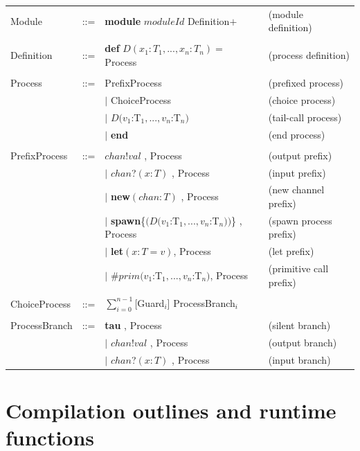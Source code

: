 \documentclass[a4paper,11pt]{article}
\newcommand{\kw}[1]{\textsf{\textbf{#1}}}
\newcommand{\code}[1]{\textsf{#1}}
\begin{document}
\begin{tabular}{llll}
Module & ::= & \kw{module} $moduleId$ Definition$+$ & (module definition) \\
\\
Definition & ::= &  \kw{def} $D(x_1:T_1, ..., x_n:T_n) = $ Process & (process definition) \\
\\
Process & ::= & PrefixProcess & (prefixed process) \\
        &    &  $|$ ChoiceProcess & (choice process) \\
        &    &  $|$ $D(v_1$:T$_1, ..., v_n$:T$_n)$ & (tail-call process) \\
        &    &  $|$ \kw{end} & (end process) \\
\\
PrefixProcess & ::= & $chan$\code{!}$val$ \code{,} Process & (output prefix) \\
              &     & $|$ $chan$\code{?}$(x:T)$ \code{,} Process & (input prefix) \\
              &     & $|$ \kw{new}$(chan:T)$ \code{,} Process & (new channel prefix) \\
              &     & $|$ \kw{spawn}\code{\{}$(D(v_1$:T$_1, ..., v_n$:T$_n))$\code{\}} \code{,} Process & (spawn process prefix) \\
              &     & $|$ \kw{let}$(x:T=v)$\code{,} Process & (let prefix) \\
              &     & $|$ \code{\#}$prim(v_1$:T$_1, ..., v_n$:T$_n)$\code{,} Process & (primitive call prefix) \\
\\
ChoiceProcess & ::= & $\sum_{i=0}^{n-1}$\code{[}Guard$_i$\code{]} ProcessBranch$_i$ \\
\\
ProcessBranch & ::= & \kw{tau} \code{,} Process & (silent branch) \\
              &     & $|$ $chan$\code{!}$val$ \code{,} Process & (output branch) \\
              &     & $|$ $chan$\code{?}$(x:T)$ \code{,} Process & (input branch) \\
            
\end{tabular}


\section{Compilation outlines and runtime functions}
\end{document}
